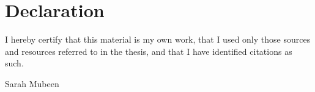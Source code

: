 \chapter*{Declaration}
\noindent I hereby certify that this material is my own work, that I used only those sources and resources referred to in the thesis, and that I have identified citations as such.

\vspace{0.3in}



\noindent Sarah Mubeen